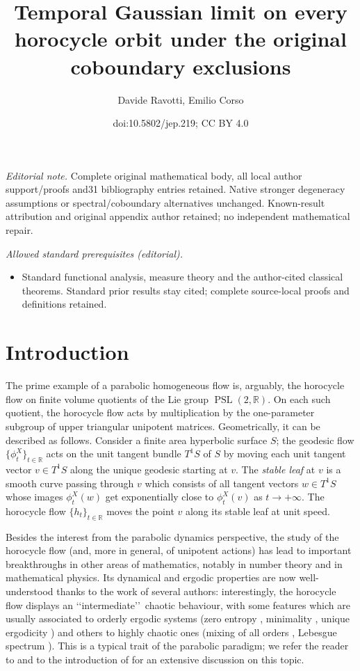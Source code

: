 \documentclass[10pt]{amsart}
\title{Temporal Gaussian limit on every horocycle orbit under the original coboundary exclusions}
\author{Davide Ravotti, Emilio Corso}
\date{doi:10.5802/jep.219; CC BY 4.0}
\newcommand \R{\mathbb{R}}
\DeclareMathOperator{\PSL}{PSL}
\theoremstyle{definition}
\begin{document}
\maketitle
\noindent\textit{Editorial note.} Complete original mathematical body, all local author support/proofs and31 bibliography entries retained. Native stronger degeneracy assumptions or spectral/coboundary alternatives unchanged. Known-result attribution and original appendix author retained; no independent mathematical repair.\par\medskip
\noindent\textit{Allowed standard prerequisites (editorial).}\begin{itemize}
\item Standard functional analysis, measure theory and the author-cited classical theorems. Standard prior results stay cited; complete source-local proofs and definitions retained.
\end{itemize}\medskip
{\let\footnotemark\relax\tableofcontents}


\section{Introduction}\label{sec:introduction}

The prime example of a parabolic homogeneous flow is, arguably, the horocycle flow on finite volume quotients of the Lie group $\PSL(2,\R)$.
On each such quotient, the horocycle flow acts by multiplication by the one-parameter subgroup of upper triangular unipotent matrices.
Geometrically, it can be described as follows. Consider a finite area hyperbolic surface $S$; the geodesic flow $\{ \phi^X_t\}_{t \in \R}$ acts on the unit tangent bundle $T^1S$ of $S$ by moving each unit tangent vector $v \in T^1S$ along the unique geodesic starting at $v$. The \emph{stable leaf} at $v$ is a smooth curve passing through $v$ which consists of all tangent vectors $w \in T^1S$ whose images $\phi^X_t(w)$ get exponentially close to $\phi^X_t(v)$ as $t \to +\infty$. The horocycle flow $\{h_t\}_{t \in \R}$ moves the point $v$ along its stable leaf at unit speed.\enlargethispage{\baselineskip}

Besides the interest from the parabolic dynamics perspective, the study of the horocycle flow (and, more in general, of unipotent actions) has lead to important breakthroughs in other areas of mathematics, notably in number theory and in mathematical physics.
Its dynamical and ergodic properties are now well-understood thanks to the work of several authors: interestingly, the horocycle flow displays an \lq\lq intermediate\rq\rq\ chaotic behaviour, with some features which are usually associated to orderly ergodic systems (zero entropy \cite{Gur}, minimality \cite{Hed}, unique ergodicity \cite{Fur}) and others to highly chaotic ones (mixing of all orders \cite{Mar}, Lebesgue spectrum \cite{Par}). This is a typical trait of the parabolic paradigm; we refer the reader to \cite[Chap.\,8]{HasKat} and to the introduction of \cite{AFRU} for an extensive discussion on this topic.
\end{document}
